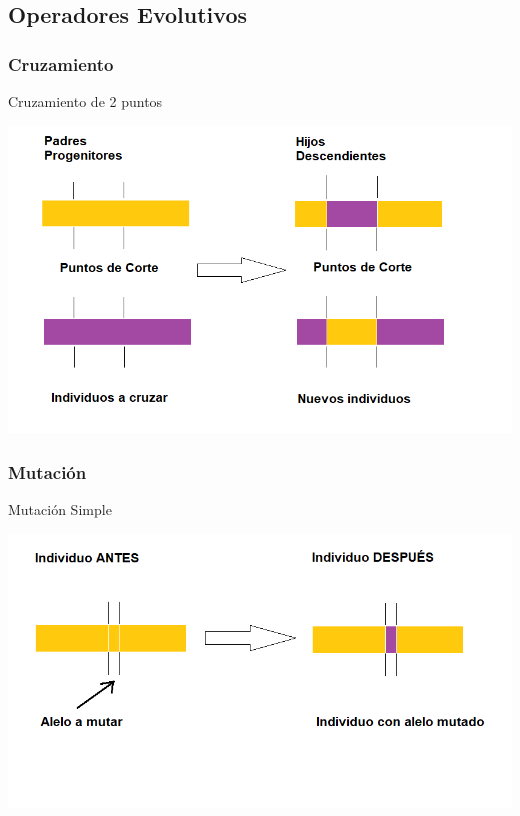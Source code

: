 \subsection{Operadores Evolutivos}
\begin{frame}\frametitle{Cruzamiento}
  
	 Cruzamiento de 2 puntos
		
	\begin{center}
    	\includegraphics[scale=0.35]{figuras/Solucion/cruza2xP3}
    \end{center}     
\end{frame}

\begin{frame}\frametitle{Mutación}
 
	Mutación Simple
		
	\begin{center}
    	\includegraphics[scale=0.35]{figuras/Solucion/mutaSimple}
    \end{center}       
\end{frame}

